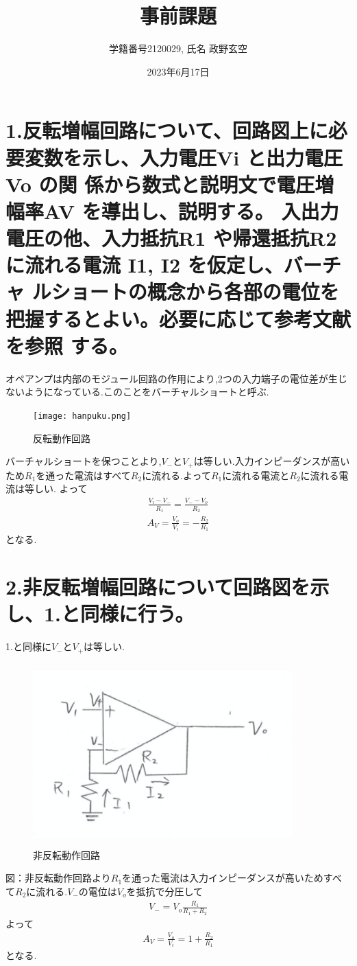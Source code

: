 \documentclass[a4j,10pt,dvipdfmx]{jarticle}
\author{学籍番号2120029, 氏名 政野玄空}
\date{2023年6月17日}
\begin{document}
\title{事前課題}
\maketitle
\section{1.反転増幅回路について、回路図上に必要変数を示し、入力電圧Vi と出力電圧Vo の関
係から数式と説明文で電圧増幅率AV を導出し、説明する。 
  入出力電圧の他、入力抵抗R1 や帰還抵抗R2 に流れる電流 I1, I2 を仮定し、バーチャ
ルショートの概念から各部の電位を把握するとよい。必要に応じて参考文献を参照
する。 }
オペアンプは内部のモジュール回路の作用により,2つの入力端子の電位差が生じないようになっている.このことをバーチャルショートと呼ぶ.
\begin{figure}[H]
  \begin{center}
  \texttt{[image: hanpuku.png]}
  \caption{反転動作回路}
\end{center}
\end{figure}
バーチャルショートを保つことより,$V_-$と$V_+$は等しい.入力インピーダンスが高いため$R_1$を通った電流はすべて$R_2$に流れる.よって$R_1$に流れる電流と$R_2$に流れる電流は等しい.
よって
\begin{eqnarray}
  \label{icib}
\frac{{V_i}-{V_-}}{R_1} = \frac{{V_-}-{V_o}}{R_2} 
\end{eqnarray}
\begin{eqnarray}
  \label{Av}
A_V=\frac{V_o}{V_i} = -\frac{R_2}{R_1} 
\end{eqnarray}
となる.
\section{2.非反転増幅回路について回路図を示し、1.と同様に行う。}
1.と同様に$V_-$と$V_+$は等しい.
\begin{figure}[H]
  \begin{center}
  \includegraphics[height=7cm,width=10cm]{hiha.png}
  \caption{非反転動作回路}
  \label{res3-2}
\end{center}
\end{figure}
図：非反転動作回路より$R_1$を通った電流は入力インピーダンスが高いためすべて$R_2$に流れる.$V_-$の電位は$V_o$を抵抗で分圧して
\begin{eqnarray}
  \label{vvvv}
V_-=V_{o}\frac{R_1}{R_1+R_2}
\end{eqnarray}
よって
\begin{eqnarray}
  \label{Av2}
A_V=\frac{V_o}{V_i} = 1+\frac{R_2}{R_1} 
\end{eqnarray}
となる.
\end{document}
